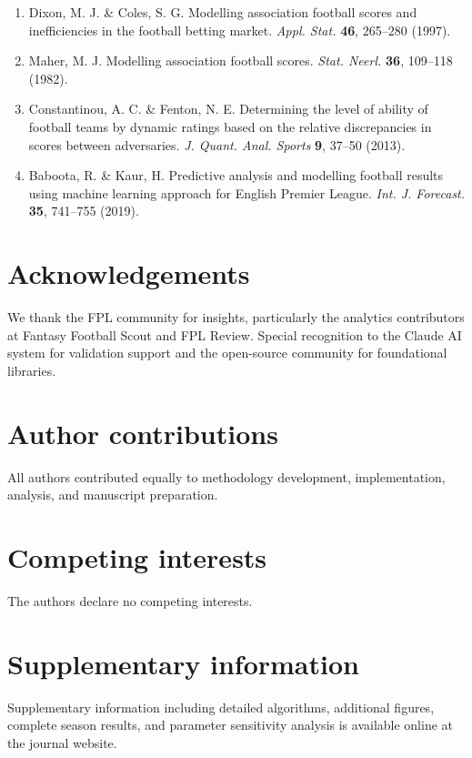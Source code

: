 \documentclass[10pt,a4paper,twocolumn]{article}
\begin{document}
\begin{enumerate}
\item Dixon, M. J. \& Coles, S. G. Modelling association football scores and inefficiencies in the football betting market. \textit{Appl. Stat.} \textbf{46}, 265–280 (1997).

\item Maher, M. J. Modelling association football scores. \textit{Stat. Neerl.} \textbf{36}, 109–118 (1982).

\item Constantinou, A. C. \& Fenton, N. E. Determining the level of ability of football teams by dynamic ratings based on the relative discrepancies in scores between adversaries. \textit{J. Quant. Anal. Sports} \textbf{9}, 37–50 (2013).

\item Baboota, R. \& Kaur, H. Predictive analysis and modelling football results using machine learning approach for English Premier League. \textit{Int. J. Forecast.} \textbf{35}, 741–755 (2019).
\end{enumerate}

\section*{Acknowledgements}

We thank the FPL community for insights, particularly the analytics contributors at Fantasy Football Scout and FPL Review. Special recognition to the Claude AI system for validation support and the open-source community for foundational libraries.

\section*{Author contributions}

All authors contributed equally to methodology development, implementation, analysis, and manuscript preparation.

\section*{Competing interests}

The authors declare no competing interests.

\section*{Supplementary information}

Supplementary information including detailed algorithms, additional figures, complete season results, and parameter sensitivity analysis is available online at the journal website.
\end{document}
